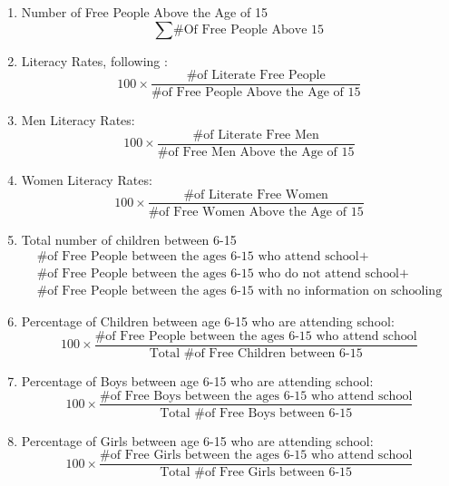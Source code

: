 \documentclass{article}
\begin{document}
\begin{enumerate}
  \item Number of Free People Above the Age of 15
  $$ \sum \text{\# Of Free People Above 15} $$

  \item Literacy Rates, following \textcite{Rocha2017-yq}: 
  $$100 \times \frac{\text{\# of Literate Free People}}{\text{\# of Free People Above the Age of 15}}$$

  \item Men Literacy Rates: 
  $$100 \times \frac{\text{\# of Literate Free Men}}{\text{\# of Free Men Above the Age of 15}}$$

  \item Women Literacy Rates: 
  $$100 \times \frac{\text{\# of Literate Free Women}}{\text{\# of Free Women Above the Age of 15}} $$

  \item Total number of children between 6-15
  \begin{equation*}
    \begin{array}{l}
  \text{\# of Free People between the ages 6-15 who attend school} + \\ \text{\# of Free People between the ages 6-15 who do not attend school} + \\ \text{\# of Free People between the ages 6-15 with no information on schooling}
    \end{array}
  \end{equation*}

  \item Percentage of Children between age 6-15 who are attending school:
  \begin{equation*}
    100 \times \frac{\text{\# of Free People between the ages 6-15 who attend school}}{\text{Total \# of Free Children between 6-15}}
  \end{equation*}

  \item Percentage of Boys between age 6-15 who are attending school:
  \begin{equation*}
    100 \times \frac{\text{\# of Free Boys between the ages 6-15 who attend school}}{\text{Total \# of Free Boys between 6-15}}
  \end{equation*}

  \item Percentage of Girls between age 6-15 who are attending school:
  \begin{equation*}
    100 \times \frac{\text{\# of Free Girls between the ages 6-15 who attend school}}{\text{Total \# of Free Girls between 6-15}}
  \end{equation*}


\end{enumerate}
\end{document}
